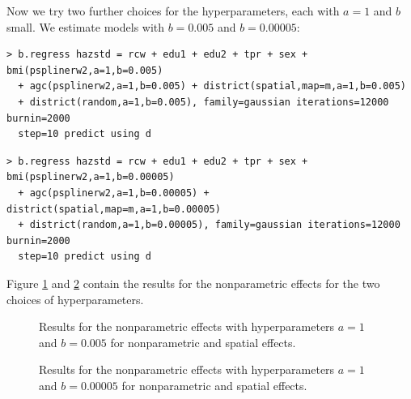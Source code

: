 Now we try two further choices for the hyperparameters, each with $a=1$ and $b$ small. We estimate models with $b=0.005$ and
$b=0.00005$:

\begin{verbatim}
> b.regress hazstd = rcw + edu1 + edu2 + tpr + sex + bmi(psplinerw2,a=1,b=0.005)
  + agc(psplinerw2,a=1,b=0.005) + district(spatial,map=m,a=1,b=0.005)
  + district(random,a=1,b=0.005), family=gaussian iterations=12000 burnin=2000
  step=10 predict using d
\end{verbatim}

\begin{verbatim}
> b.regress hazstd = rcw + edu1 + edu2 + tpr + sex + bmi(psplinerw2,a=1,b=0.00005)
  + agc(psplinerw2,a=1,b=0.00005) + district(spatial,map=m,a=1,b=0.00005)
  + district(random,a=1,b=0.00005), family=gaussian iterations=12000 burnin=2000
  step=10 predict using d
\end{verbatim}

Figure \ref{mcmc:sensi2} and \ref{mcmc:sensi3} contain the results for the nonparametric effects for the two choices of
hyperparameters.

\begin{figure}[ht]
\begin{center}
 {\it\caption{Results for
the nonparametric effects with hyperparameters $a=1$ and $b=0.005$
for nonparametric and spatial effects.\label{mcmc:sensi2}}}
\end{center}
\end{figure}

\begin{figure}[ht]
\begin{center}
 {\it\caption{Results for
the nonparametric effects with hyperparameters $a=1$ and $b=0.00005$
for nonparametric and spatial effects.\label{mcmc:sensi3}}}
\end{center}
\end{figure}
